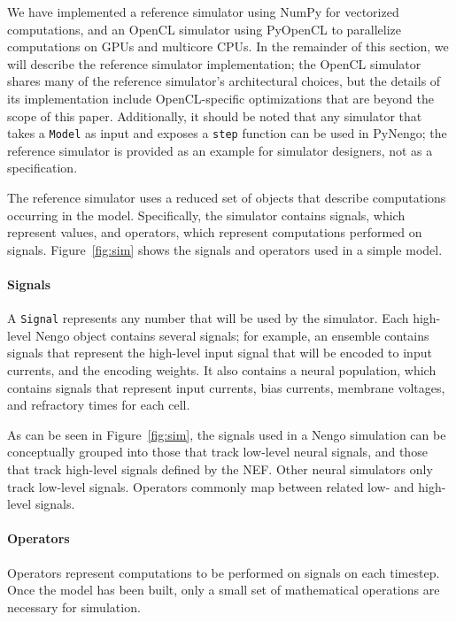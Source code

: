 \documentclass{frontiersSCNS}
\begin{document}
We have implemented
a reference simulator using NumPy
for vectorized computations,
and an OpenCL simulator
using PyOpenCL to parallelize
computations on GPUs and multicore CPUs.
In the remainder of this section,
we will describe
the reference simulator implementation;
the OpenCL simulator shares many
of the reference simulator's architectural choices,
but the details of its implementation
include OpenCL-specific optimizations
that are beyond the scope of this paper.
Additionally, it should be noted that
any simulator that takes a \texttt{Model}
as input and exposes a \texttt{step}
function can be used in PyNengo;
the reference simulator
is provided as an example
for simulator designers,
not as a specification.

The reference simulator
uses a reduced set of objects
that describe computations
occurring in the model.
Specifically, the simulator
contains signals, which represent values,
and operators, which represent computations
performed on signals.
Figure~\ref{fig:sim} shows the signals
and operators used in a simple model.

\paragraph{Signals}

A \texttt{Signal} represents any number that
will be used by the simulator.
Each high-level Nengo object contains
several signals;
for example, an ensemble contains signals
that represent the high-level input
signal that will be encoded
to input currents,
and the encoding weights.
It also contains a neural population,
which contains signals that represent
input currents, bias currents,
membrane voltages, and refractory times for each cell.

As can be seen in Figure~\ref{fig:sim},
the signals used in a Nengo simulation
can be conceptually grouped into
those that track low-level neural signals,
and those that track high-level signals
defined by the NEF.
Other neural simulators only track
low-level signals.
Operators commonly map
between related low- and high-level signals.

\paragraph{Operators}

Operators represent computations
to be performed on signals on each timestep.
Once the model has been built,
only a small set of mathematical
operations are necessary for simulation.
\end{document}
